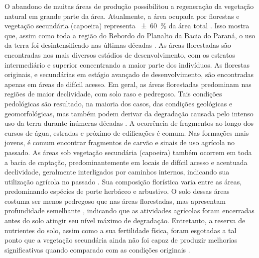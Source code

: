 
O abandono de muitas áreas de produção possibilitou a regeneração da vegetação natural em grande parte da 
área. Atualmente, a área ocupada por florestas e vegetação secundária (capoeira) representa 
\SI{\pm60}{\percent} da área total \cite{SamuelRosaEtAl2011a}. Isso mostra que, assim como toda a região do 
Rebordo do Planalto da Bacia do Paraná, o uso da terra foi desintensificado nas últimas décadas 
\cite{SEMA/UFSM2001, DillEtAl2004, Poelking2007, Miguel2010, SamuelRosaEtAl2011a, Dullius2012, 
TenCatenEtAl2012}. As áreas florestadas são encontradas nos mais diversos estádios de desenvolvimento, com os 
estratos intermediário e superior concentrando a maior parte dos indivíduos. As florestas originais, e 
secundárias em estágio avançado de desenvolvimento, são encontradas apenas em áreas de difícil acesso. Em 
geral, as áreas florestadas predominam nas regiões de maior declividade, com solo raso e pedregoso. Tais 
condições pedológicas são resultado, na maioria dos casos, das condições geológicas e geomorfológicas, mas 
também podem derivar da degradação causada pelo intenso uso da terra durante inúmeras décadas 
\cite{SamuelRosaEtAl2011a}. A ocorrência de fragmentos ao longo dos cursos de água, estradas e próximo de 
edificações é comum. Nas formações mais jovens, é comum encontrar fragmentos de carvão e sinais de uso 
agrícola 
no passado. As áreas sob vegetação secundária (capoeira) também ocorrem em toda a bacia de captação, 
predominantemente em locais de difícil acesso e acentuada declividade, geralmente interligados por caminhos 
internos, indicando sua utilização agrícola no passado \cite{SamuelRosaEtAl2011a}. Sua composição florística 
varia entre as áreas, predominando espécies de porte herbáceo e arbustivo. O solo dessas áreas costuma ser 
menos pedregoso que nas áreas florestadas, mas apresentam profundidade semelhante \cite{SamuelRosaEtAl2011a}, 
indicando que as atividades agrícolas foram encerradas antes do solo atingir seu nível máximo de degradação. 
Entretanto, a reserva de nutrientes do solo, assim como a sua fertilidade física, foram esgotadas a tal ponto 
que a vegetação secundária ainda não foi 
capaz de produzir melhorias significativas quando comparado com as condições originais \cite{Menezes2008, 
Zalamena2008}.

